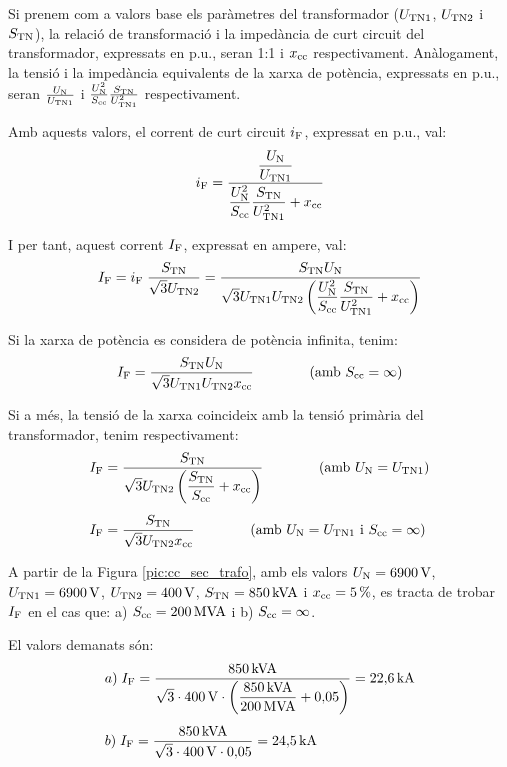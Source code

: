  Si prenem com a valors base els
par\`{a}metres del transformador ($U_\mathrm{TN1}$, $U_\mathrm{TN2}$ i
$S_\mathrm{TN}$), la relaci\'{o} de transformaci\'{o} i la imped\`{a}ncia de curt
circuit del transformador, expressats en p.u., seran 1:1 i
$x_\mathrm{cc}$ respectivament. An\`{a}logament, la tensi\'{o} i la imped\`{a}ncia
equivalents de la xarxa de pot\`{e}ncia, expressats en p.u., seran
$\frac{U_\mathrm{N}}{U_\mathrm{TN1}}$ i $\frac{U_\mathrm{N}^2}{S_\mathrm{cc}}
\frac{S_\mathrm{TN}}{U_\mathrm{TN1}^2}$ respectivament.

Amb aquests valors, el corrent de curt circuit $i_\mathrm{F}$, expressat
en p.u., val:
\begin{equation}
    i_\mathrm{F} = \frac{\dfrac{U_\mathrm{N}}{U_\mathrm{TN1}}}{\dfrac{U_\mathrm{N}^2}{S_\mathrm{cc}}
    \dfrac{S_\mathrm{TN}}{U_\mathrm{TN1}^2} + x_\mathrm{cc}}
\end{equation}

I per tant, aquest corrent $I_\mathrm{F}$, expressat en ampere, val:
\begin{equation}
    I_\mathrm{F} = i_\mathrm{F}\; \frac{S_\mathrm{TN}}{\sqrt{3}U_\mathrm{TN2}} =
    \frac{S_\mathrm{TN} U_\mathrm{N}}{\sqrt{3} U_\mathrm{TN1}U_\mathrm{TN2}
    \left(\dfrac{U_\mathrm{N}^2}{S_\mathrm{cc}}
    \dfrac{S_\mathrm{TN}}{U_\mathrm{TN1}^2} + x_\mathrm{cc}\right)}
\end{equation}

Si la xarxa de pot\`{e}ncia es considera de pot\`{e}ncia infinita, tenim:
\begin{equation}
    I_\mathrm{F} = \frac{S_\mathrm{TN} U_\mathrm{N}}{\sqrt{3} U_\mathrm{TN1}U_\mathrm{TN2}
    x_\mathrm{cc}}\qquad\qquad (\text{amb }S_\mathrm{cc}=\infty)
\end{equation}

Si a m\'{e}s, la tensi\'{o} de la xarxa coincideix amb la tensi\'{o} prim\`{a}ria
del transformador, tenim respectivament:
\begin{align}
    I_\mathrm{F} &= \frac{S_\mathrm{TN}}{\sqrt{3} U_\mathrm{TN2}
    \left(\dfrac{S_\mathrm{TN}}{S_\mathrm{cc}} +
    x_\mathrm{cc}\right)}\qquad\qquad(\text{amb }U_\mathrm{N}=U_\mathrm{TN1})\\[1ex]
    I_\mathrm{F} &= \frac{S_\mathrm{TN}}{\sqrt{3} U_\mathrm{TN2}
    x_\mathrm{cc}}\qquad\qquad(\text{amb }U_\mathrm{N}=U_\mathrm{TN1}\text{ i }
    S_\mathrm{cc}=\infty)
\end{align}

\begin{exemple}
A partir de la Figura \vref{pic:cc_sec_trafo}, amb els valors
$U_\mathrm{N}=6900\mathrm{\,V}$, $U_\mathrm{TN1}=6900\mathrm{\,V}$,
$U_\mathrm{TN2}=400\mathrm{\,V}$, $S_\mathrm{TN}=850\mathrm{\,kVA}$ i
$x_\mathrm{cc}=5\mathrm{\,\%}$, es tracta de trobar $I_\mathrm{F}$ en el cas
que: a) $S_\mathrm{cc}=200\mathrm{\,MVA}$ i b) $S_\mathrm{cc}=\infty$.

El valors demanats s\'{o}n:
\begin{align*}
   &a)\;I_\mathrm{F} = \frac{850\mathrm{\,kVA}}{\sqrt{3}\cdot 400\mathrm{\,V}\cdot
   \left(\dfrac{850\mathrm{\,kVA}}{200\mathrm{\,MVA}} +
   0{,}05\right)} = 22{,}6\mathrm{\,kA} \\[1ex]
   &b)\;I_\mathrm{F} = \frac{850\mathrm{\,kVA}}{\sqrt{3}\cdot 400\mathrm{\,V}\cdot
   0{,}05} = 24{,}5\mathrm{\,kA}
\end{align*}

\end{exemple}
